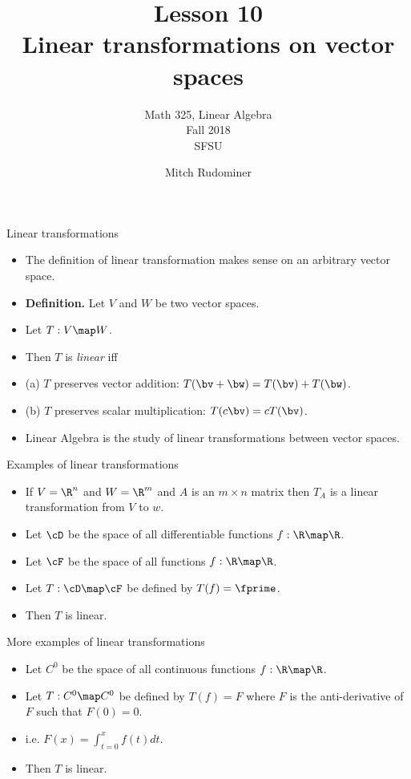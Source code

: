 \documentclass{beamer}
\title{Lesson 10 \\ Linear transformations on vector spaces}
\subtitle{Math 325, Linear Algebra \\ Fall 2018 \\ SFSU}
\author{Mitch Rudominer}
\date{}
\begin{document}
\begin{frame}
  \titlepage
\end{frame}

\begin{frame}{Linear transformations}

\begin{itemize}
\item The definition of linear transformation makes sense on an arbitrary vector space.
\item \textbf{Definition.} Let $V$ and $W$ be two vector spaces.
\item Let $T:V\map W$.
\item Then $T$ is \emph{linear} iff
\item (a) $T$ preserves vector addition: $T(\bv+\bw) = T(\bv) + T(\bw)$.
\item (b) $T$ preserves scalar multiplication: $T(c\bv) = c T(\bv)$.
\item Linear Algebra is the study of linear transformations between vector spaces.
\end{itemize}

\end{frame}


\begin{frame}{Examples of linear transformations}

\begin{itemize}
\item If $V=\R^n$ and $W=\R^m$ and $A$ is an $m\times n$ matrix then
$T_A$ is a linear transformation from $V$ to $w$.
\item Let $\cD$ be the space of all differentiable functions $f:\R\map\R$.
\item Let $\cF$ be the space of all functions $f:\R\map\R$.
\item Let $T:\cD\map\cF$ be defined by $T(f) = \fprime$.
\item Then $T$ is linear.
\end{itemize}

\end{frame}


\begin{frame}{More examples of linear transformations}

\begin{itemize}
\item Let $C^0$ be the space of all continuous functions $f:\R\map\R$.
\item Let $T:C^0\map C^0$ be defined by $T(f) = F$ where $F$ is the
anti-derivative of $F$ such that $F(0) = 0$.
\item i.e. $F(x) = \int_{t=0}^x f(t) dt$.
\item Then $T$ is linear.
\end{itemize}

\end{frame}
\end{document}
